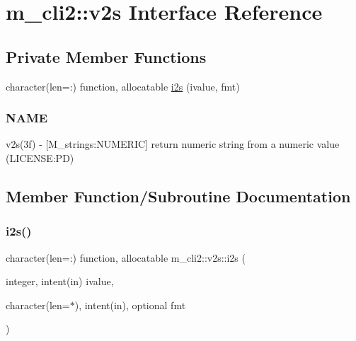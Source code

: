 \hypertarget{interfacem__cli2_1_1v2s}{}\section{m\+\_\+cli2\+:\+:v2s Interface Reference}
\label{interfacem__cli2_1_1v2s}
\subsection*{Private Member Functions}
\begin{DoxyCompactItemize}
\item 
character(len=\+:) function, allocatable \mbox{\hyperlink{interfacem__cli2_1_1v2s_a15467a4cf2f813fa65c4bbb460e04c69}{i2s}} (ivalue, fmt)
\begin{DoxyCompactList}\small\item\em \subsubsection*{N\+A\+ME}

v2s(3f) -\/ \mbox{[}M\+\_\+strings\+:N\+U\+M\+E\+R\+IC\mbox{]} return numeric string from a numeric value (L\+I\+C\+E\+N\+SE\+:PD) \end{DoxyCompactList}\end{DoxyCompactItemize}


\subsection{Member Function/\+Subroutine Documentation}
\mbox{\label{interfacem__cli2_1_1v2s_a15467a4cf2f813fa65c4bbb460e04c69}} 
\subsubsection{\texorpdfstring{i2s()}{i2s()}}
{\footnotesize\ttfamily character(len=\+:) function, allocatable m\+\_\+cli2\+::v2s\+::i2s (\begin{DoxyParamCaption}\item[{integer, intent(in)}]{ivalue,  }\item[{character(len=$\ast$), intent(in), optional}]{fmt }\end{DoxyParamCaption})\hspace{0.3cm}{\ttfamily [private]}}



